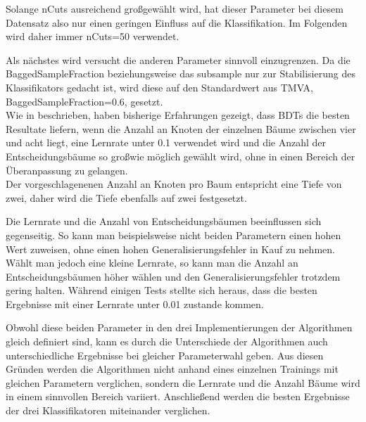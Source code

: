 Solange nCuts ausreichend gro\ss  gew\"ahlt wird, hat dieser Parameter bei diesem Datensatz also nur einen geringen Einfluss auf die Klassifikation. Im Folgenden wird daher immer nCuts=\num{50} verwendet.

Als n\"achstes wird versucht die anderen Parameter sinnvoll einzugrenzen. Da die BaggedSampleFraction beziehungsweise das subsample nur zur Stabilisierung des Klassifikators gedacht ist, wird diese auf den Standardwert aus TMVA, BaggedSampleFraction=\num{0,6}, gesetzt.\\
Wie in \cite{SWB-307748006} beschrieben, haben bisherige Erfahrungen gezeigt, dass BDTs die besten Resultate liefern, wenn die Anzahl an Knoten der einzelnen B\"aume zwischen vier und acht liegt, eine Lernrate unter \num{0,1} verwendet wird und die Anzahl der Entscheidungsb\"aume so gro\ss  wie m\"oglich gew\"ahlt wird, ohne in einen Bereich der \"Uberanpassung zu gelangen.\\
Der vorgeschlagenenen Anzahl an Knoten pro Baum entspricht eine Tiefe von zwei, daher wird die Tiefe ebenfalls auf zwei festgesetzt.

Die Lernrate und die Anzahl von Entscheidungsb\"aumen beeinflussen sich gegenseitig. So kann man beispielsweise nicht beiden Parametern einen hohen Wert zuweisen, ohne einen hohen Generalisierungsfehler in Kauf zu nehmen. W\"ahlt man jedoch eine kleine Lernrate, so kann man die Anzahl an Entscheidungsb\"aumen h\"oher w\"ahlen und den Generalisierungsfehler trotzdem gering halten. W\"ahrend einigen Tests stellte sich heraus, dass die besten Ergebnisse mit einer Lernrate unter \num{0,01} zustande kommen.

Obwohl diese beiden Parameter in den drei Implementierungen der Algorithmen gleich definiert sind, kann es durch die Unterschiede der Algorithmen auch unterschiedliche Ergebnisse bei gleicher Parameterwahl geben. Aus diesen Gr\"unden werden die Algorithmen nicht anhand eines einzelnen Trainings mit gleichen Parametern verglichen, sondern die Lernrate und die Anzahl B\"aume wird in einem sinnvollen Bereich variiert. Anschlie\ss end werden die besten Ergebnisse der drei Klassifikatoren miteinander verglichen.

